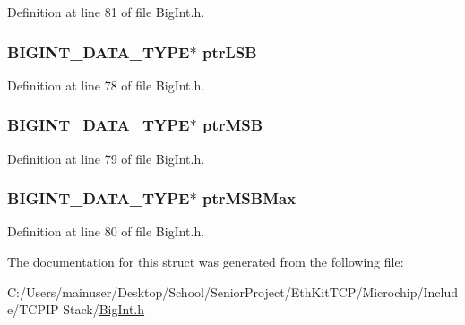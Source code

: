 Definition at line 81 of file Big\+Int.\+h.

\hypertarget{struct_b_i_g_i_n_t_a144359039641b54326b266b7a4706341}{}
\subsubsection[{ptr\+L\+S\+B}]{\setlength{\rightskip}{0pt plus 5cm}B\+I\+G\+I\+N\+T\+\_\+\+D\+A\+T\+A\+\_\+\+T\+Y\+P\+E$\ast$ ptr\+L\+S\+B}\label{struct_b_i_g_i_n_t_a144359039641b54326b266b7a4706341}


Definition at line 78 of file Big\+Int.\+h.

\hypertarget{struct_b_i_g_i_n_t_ae84fcf922ad9a2c86106cb370a2cde11}{}
\subsubsection[{ptr\+M\+S\+B}]{\setlength{\rightskip}{0pt plus 5cm}B\+I\+G\+I\+N\+T\+\_\+\+D\+A\+T\+A\+\_\+\+T\+Y\+P\+E$\ast$ ptr\+M\+S\+B}\label{struct_b_i_g_i_n_t_ae84fcf922ad9a2c86106cb370a2cde11}


Definition at line 79 of file Big\+Int.\+h.

\hypertarget{struct_b_i_g_i_n_t_a0ac0ae49e5682784ac4fd57099abd1e2}{}
\subsubsection[{ptr\+M\+S\+B\+Max}]{\setlength{\rightskip}{0pt plus 5cm}B\+I\+G\+I\+N\+T\+\_\+\+D\+A\+T\+A\+\_\+\+T\+Y\+P\+E$\ast$ ptr\+M\+S\+B\+Max}\label{struct_b_i_g_i_n_t_a0ac0ae49e5682784ac4fd57099abd1e2}


Definition at line 80 of file Big\+Int.\+h.



The documentation for this struct was generated from the following file\+:\begin{DoxyCompactItemize}
\item 
C\+:/\+Users/mainuser/\+Desktop/\+School/\+Senior\+Project/\+Eth\+Kit\+T\+C\+P/\+Microchip/\+Include/\+T\+C\+P\+I\+P Stack/\hyperlink{_big_int_8h}{Big\+Int.\+h}\end{DoxyCompactItemize}
